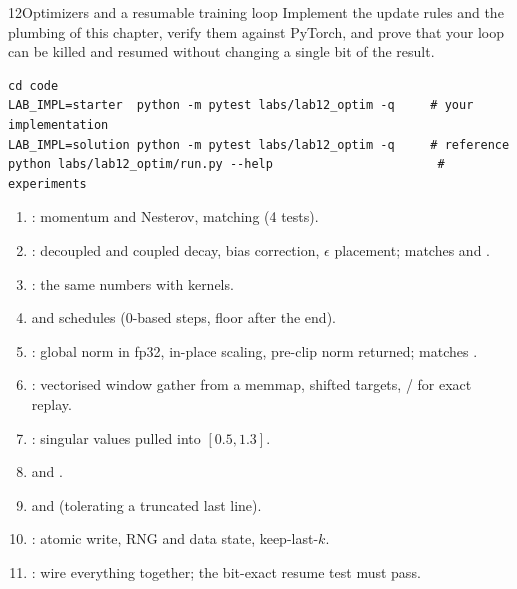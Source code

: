 \begin{labbox}{12}{Optimizers and a resumable training loop}
Implement the update rules and the plumbing of this chapter, verify them against PyTorch, and
prove that your loop can be killed and resumed without changing a single bit of the result.

\begin{lstlisting}[style=shell]
cd code
LAB_IMPL=starter  python -m pytest labs/lab12_optim -q     # your implementation
LAB_IMPL=solution python -m pytest labs/lab12_optim -q     # reference
python labs/lab12_optim/run.py --help                       # experiments
\end{lstlisting}

\begin{enumerate}
  \item {}: momentum and Nesterov, matching  (4 tests).
  \item {}: decoupled and coupled decay, bias correction, $\epsilon$
        placement; matches  and .
  \item {}: the same numbers with  kernels.
  \item {} and  schedules (0-based steps, floor after the end).
  \item {}: global norm in fp32, in-place scaling, pre-clip norm returned;
        matches .
  \item {}: vectorised window gather from a memmap, shifted targets,
        / for exact replay.
  \item {}: singular values pulled into $[0.5,1.3]$.
  \item {} and .
  \item {} and  (tolerating a truncated last line).
  \item {}: atomic write, RNG and data state, keep-last-$k$.
  \item {}: wire everything together; the bit-exact resume test must pass.
\end{enumerate}


\end{labbox}
